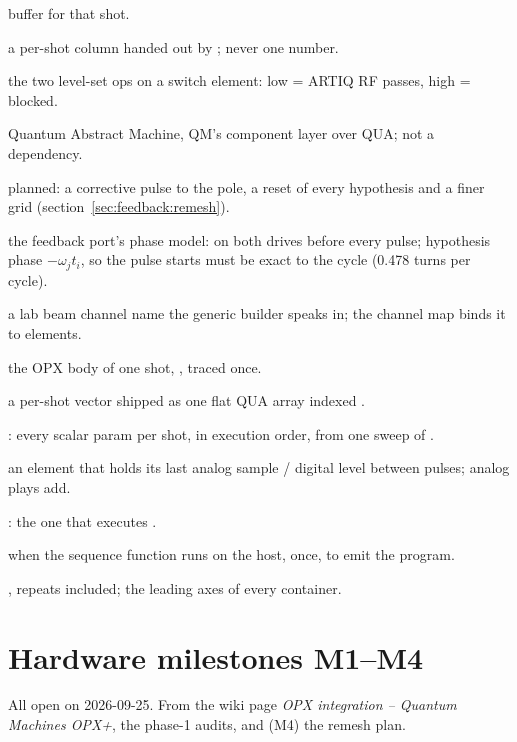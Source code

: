 \begin{description}[nosep, font=\normalfont\ttfamily]
    buffer for that shot.
  \item[ParamRef] a per-shot column handed out by ; never one
    number.
  \item[pass / block] the two level-set ops on a switch element: low = ARTIQ
    RF passes, high = blocked.
  \item[QUAM] Quantum Abstract Machine, QM's component layer over QUA; not a
    dependency.
  \item[remesh (pole return)] planned: a corrective pulse to the pole, a
    reset of every hypothesis and a finer grid (section~\ref{sec:feedback:remesh}).
  \item[reset model] the feedback port's phase model: 
    on both drives before every pulse; hypothesis phase $-\omega_j t_i$, so
    the pulse starts must be exact to the cycle (0.478 turns per cycle).
  \item[role] a lab beam channel name the generic builder speaks in; the
    channel map binds it to elements.
  \item[sequence] the OPX body of one shot, , traced
    once.
  \item[shot array] a per-shot vector shipped as one flat QUA array indexed
    .
  \item[shot tables] : every scalar param per shot, in
    execution order, from one sweep of .
  \item[sticky] an element that holds its last analog sample / digital level
    between pulses; analog plays add.
  \item[sync element] : the one that executes
    .
  \item[trace time] when the sequence function runs on the host, once, to
    emit the program.
  \item[xvardims] , repeats included; the leading
    axes of every container.
\end{description}

\section{Hardware milestones M1--M4}
\label{sec:milestones}

All open on 2026-09-25. From the wiki page
\emph{OPX integration -- Quantum Machines OPX+}, the phase-1 audits, and (M4)
the remesh plan.

